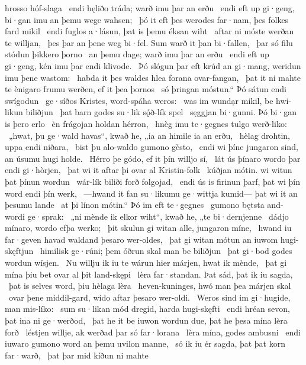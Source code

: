 hrosso hóf-slaga \hld\ endi hęliðo tráda;
warð imu þar an erðu \hld\ endi eft up gi·geng,
bi·gan imu an þemu wege wahsen; \hld\ þó it eft þes werodes far·nam,
þes folkes fard mikil \hld\ endi fuglos a·lásun,
þat is þemu éksan wiht \hld\ aftar ni móste
werðan te willjan, \hld\ þes þar an þene weg bi·fel.
Sum warð it þan bi·fallen, \hld\ þar só filu stódun
þikkero þorno \hld\ an þemu dage;
warð imu þar an erðu \hld\ endi eft up gi·geng,
kén imu þar endi klivode. \hld\ Þó slógun þar eft krúd an gi·mang,
weridun imu þene wastom: \hld\ habda it þes waldes hlea
forana ovar-fangan, \hld\ þat it ni mahte te ènigaro frumu werðen,
ef it þea þornos \hld\ só þringan móstun.“
Þó sátun endi swígodun \hld\ ge·síðos Kristes,
word-spáha weros: \hld\ was im wundạr mikil,
be hwi-likun biliðjun \hld\ þat barn godes
su·lik sǫ́ð-lík spel \hld\ sęggjan bi·gunni.
Þó bi·gan is þero erlo \hld\ èn frágojan
holdan hérron, \hld\ hnèg imu te·gegnes
tulgo werð-liko: \hld\ „hwat, þu ge·wald havas“, kwað he,
„ia an himile ia an erðu, \hld\ hèlag drohtin,
uppa endi niðara, \hld\ bist þu alo-waldo
gumono gèsto, \hld\ endi wi þíne jungaron sind,
an úsumu hugi holde. \hld\ Hérro þe gódo,
ef it þín willjo sí, \hld\ lát ús þínaro wordo þar
endi gi·hòrjen, \hld\ þat wi it aftar þi
ovar al Kristin-folk \hld\ kúðjan mótin.
wi witun þat þínun wordun \hld\ wár-lík biliði
forð folgojad, \hld\ endi ús is firinun þarf,
þat wi þín word endi þín werk, \hld\ —hwand it fan su·likumu ge·wittja kumid—
þat wi it an þesumu lande \hld\ at þi línon mótin.“
Þó im eft te·gegnes \hld\ gumono bętsta
and-wordi ge·sprak: \hld\ „ni mènde ik elkor wiht“, kwað he,
„te bi·dernjenne \hld\ dádjo mínaro,
wordo efþa werko; \hld\ þit skulun gi witan alle,
jungaron míne, \hld\ hwand iu far·geven havad
waldand þesaro wer-oldes, \hld\ þat gi witan mótun
an iuwom hugi-skęftjun \hld\ himilisk ge·rúni;
þem óðrun skal man be biliðjun \hld\ þat gi·bod godes
wordun wísjen. \hld\ Nu willju ik iu te wárun hier
márjen, hwat ik mènde, \hld\ þat gi mína þiu bet
ovar al þit land-skępi \hld\ lèra far·standan.
Þat sád, þat ik iu sagda, \hld\ þat is selves word,
þiu hèlaga lèra \hld\ heven-kuninges,
hwó man þea márjen skal \hld\ ovar þene middil-gard,
wído aftar þesaro wer-oldi. \hld\ Weros sind im gi·hugide,
man mis-líko: \hld\ sum su·likan mód dregid,
harda hugi-skęfti \hld\ endi hréan sevon,
þat ina ni ge·werðod, \hld\ þat he it be iuwon wordun due,
þat he þesa mína lèra forð \hld\ léstjen willje,
ak werðad þar só far·lorana \hld\ lèra mína,
godes ambusni \hld\ endi iuwaro gumono word
an þemu uvilon manne, \hld\ só ik iu ér sagda,
þat þat korn far·warð, \hld\ þat þar mid kíðun ni mahte
